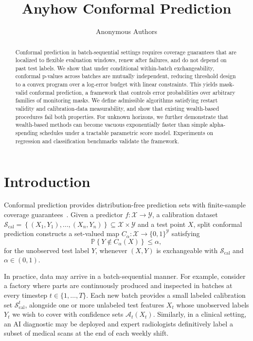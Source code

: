 \documentclass{uai2026} %
\title{Anyhow Conformal Prediction}
\author[1]{Anonymous Authors}
\affil[1]{Anonymous Affiliation}
\newcommand{\1}{\mathbf{1}}
\newcommand{\prob}{\mathbb{P}}
\newcommand{\xcal}{\mathcal{X}}
\newcommand{\ycal}{\mathcal{Y}}
\newcommand{\scal}{\mathcal{S}}
\newcommand{\ens}[1]{\left\{#1\right\}}
\newcommand{\cali}{\mathrm{cal}}
\newcommand{\scalcal}{\scal_{\cali}}
\newcommand{\acal}{\mathcal{A}}
\begin{document}
\maketitle

\begin{abstract}
Conformal prediction in batch-sequential settings requires coverage guarantees that are localized to flexible evaluation windows, renew after failures, and do not depend on past test labels. We show that under conditional within-batch exchangeability, conformal p-values across batches are mutually independent, reducing threshold design to a convex program over a log-error budget with linear constraints. This yields mask-valid conformal prediction, a framework that controls error probabilities over arbitrary families of monitoring masks. We define admissible algorithms satisfying restart validity and calibration-data measurability, and show that existing wealth-based procedures fail both properties. For unknown horizons, we further demonstrate that wealth-based methods can become vacuous exponentially faster than simple alpha-spending schedules under a tractable parametric score model. Experiments on regression and classification benchmarks validate the framework.
\end{abstract}


\section{Introduction}

Conformal prediction provides distribution-free prediction sets with finite-sample coverage guarantees~\citep{vovk2005algorithmic,angelopoulos2024theoretical,shafer2008tutorial}.
Given a predictor $f:\xcal\to\ycal$, a calibration dataset $\scalcal=\ens{(X_1,Y_1),\ldots,(X_n,Y_n)}\subseteq\xcal\times\ycal$ and a test point $X$, split conformal prediction constructs a set-valued map $C_\alpha:\xcal \to \{0,1\}^{\ycal}$ satisfying
\begin{equation*}
  \prob\ens{Y\not\in C_\alpha(X)}\le \alpha,
\end{equation*}
for the unobserved test label $Y$, whenever $(X,Y)$ is exchangeable with $\scalcal$ and $\alpha\in(0,1)$.

In practice, data may arrive in a batch-sequential manner. For example, consider a factory where parts are continuously produced and inspected in batches at every timestep $t\in\{1,\dots,T\}$. Each new batch provides a small labeled calibration set $\scalcal^t$, alongside one or more unlabeled test features $X_t$ whose unobserved labels $Y_t$ we wish to cover with confidence sets $\acal_t(X_t)$. Similarly, in a clinical setting, an AI diagnostic may be deployed and expert radiologists definitively label a subset of medical scans at the end of each weekly shift.
\end{document}
